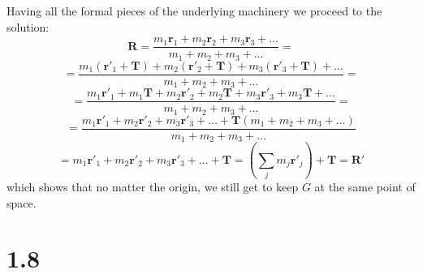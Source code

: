 \documentclass{article}
\begin{document}
Having all the formal pieces of
the underlying machinery we proceed to the solution:
\begin{equation*}
    \textbf{R} = \frac{m_{1}\textbf{r}_{1} + m_{2}\textbf{r}_{2} + m_{3}\textbf{r}_{3} + \dots}{m_1 + m_2 + m_3 + \dots} =
\end{equation*} 
\begin{equation*}
    = \frac{m_{1}(\textbf{r}'_{1} + \textbf{T}) + m_{2}(\textbf{r}'_{2} + \textbf{T}) + m_{3}(\textbf{r}'_{3} + \textbf{T}) + \dots}{{m_1 + m_2 + m_3 + \dots}} =
\end{equation*}
\begin{equation*}
    = \frac{m_{1}\textbf{r}'_{1} + m_{1}\textbf{T} + m_{2}\textbf{r}'_{2} + m_{2}\textbf{T} + m_{3}\textbf{r}'_{3} + m_{3}\textbf{T} + \dots}{{m_1 + m_2 + m_3 + \dots}} =
\end{equation*}
\begin{equation*}
    = \frac{m_{1}\textbf{r}'_{1} + m_{2}\textbf{r}'_{2} + m_{3}\textbf{r}'_{3} + \dots + \textbf{T}(m_1 + m_2 + m_3 + \dots)}{m_1 + m_2 + m_3 + \dots}
\end{equation*}
\begin{equation*}
    = m_{1}\textbf{r}'_{1} + m_{2}\textbf{r}'_{2} + m_{3}\textbf{r}'_{3} + \dots + \textbf{T} = (\sum_{j}m_{j}\textbf{r}'_{j}) + \textbf{T} = \textbf{R}'
\end{equation*}
which shows that no matter the origin, we still get to keep \(G\) at the same point of space.











\section*{1.8}
\end{document}
